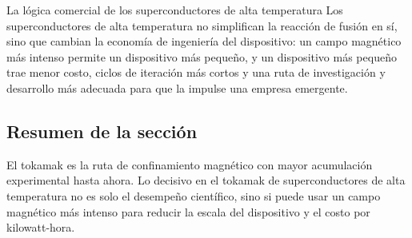 \begin{importantbox}{La lógica comercial de los superconductores de alta temperatura}
Los superconductores de alta temperatura no simplifican la reacción de fusión en sí, sino que cambian la economía de ingeniería del dispositivo: un campo magnético más intenso permite un dispositivo más pequeño, y un dispositivo más pequeño trae menor costo, ciclos de iteración más cortos y una ruta de investigación y desarrollo más adecuada para que la impulse una empresa emergente.
\end{importantbox}

\subsection{Resumen de la sección}

El tokamak es la ruta de confinamiento magnético con mayor acumulación experimental hasta ahora. Lo decisivo en el tokamak de superconductores de alta temperatura no es solo el desempeño científico, sino si puede usar un campo magnético más intenso para reducir la escala del dispositivo y el costo por kilowatt-hora.
